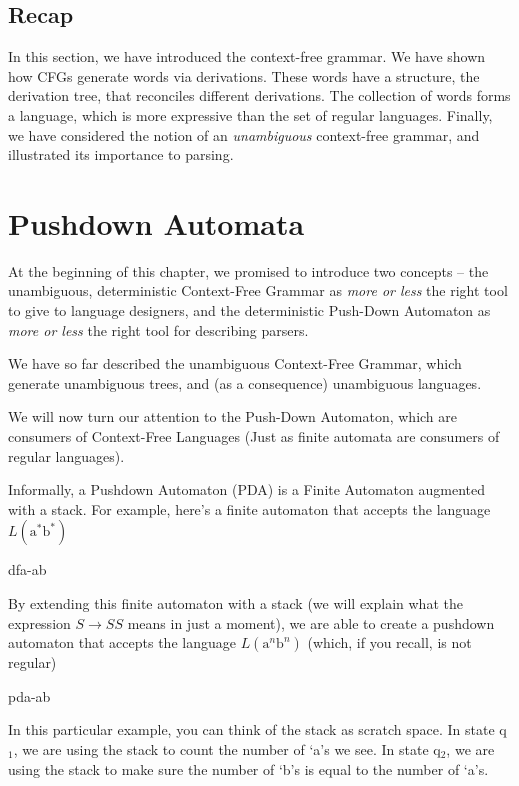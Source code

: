 \subsection{Recap}
In this section, we have introduced the context-free grammar. We have shown how CFGs generate words via derivations. These words have a structure, the derivation tree, that reconciles different derivations. The collection of words forms a language, which is more expressive than the set of regular languages. Finally, we have considered the notion of an \textit{unambiguous} context-free grammar, and illustrated its importance to parsing.

\section{Pushdown Automata}\label{section:pushdownautomata}
At the beginning of this chapter, we promised to introduce two concepts -- the unambiguous, deterministic Context-Free Grammar as \textit{more or less} the right tool to give to language designers, and the deterministic Push-Down Automaton as \textit{more or less} the right tool for describing parsers.

We have so far described the unambiguous Context-Free Grammar, which generate unambiguous trees, and (as a consequence) unambiguous languages. 

We will now turn our attention to the Push-Down Automaton, which are consumers of Context-Free Languages (Just as finite automata are consumers of regular languages). 

Informally, a Pushdown Automaton (PDA) is a Finite Automaton augmented with a stack. For example, here's a finite automaton that accepts the language $L(\text{a}^*\text{b}^*)$
\begin{center}
    {dfa-ab}
\end{center}
By extending this finite automaton with a stack (we will explain what the expression $S \to SS$ means in just a moment), we are able to create a pushdown automaton that accepts the language $L(\text{a}^n\text{b}^n)$ (which, if you recall, is not regular)
\begin{center}
    {pda-ab}
\end{center}

In this particular example, you can think of the stack as scratch space. In state q$_1$, we are using the stack to count the number of `a's we see. In state q$_2$, we are using the stack to make sure the number of `b's is equal to the number of `a's.

